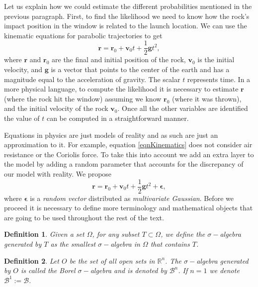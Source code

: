 \documentclass[12pt]{book}
\newtheorem{definition}{Definition}
\begin{document}
Let us explain how we could estimate the different probabilities mentioned in the previous paragraph. 
First, to find the likelihood
we need to know how the rock's impact position  in the window  is related to the launch location. 
We can use
the kinematic equations  for parabolic trajectories to get \cite{arnol2013mathematical}
\begin{equation}\label{eqnKinematics}
\textbf{r}=\textbf{r}_{0}+\textbf{v}_{0}t+\frac{1}{2}\textbf{g}t^{2},
\end{equation} 
where $\textbf{r}$ and $\textbf{r}_{0}$ are the final and initial position of the rock, 
$\textbf{v}_{0}$ is 
the initial velocity,  and $\textbf{g}$ is  a vector that points to the center of the earth and has a 
magnitude equal to the acceleration of gravity. The scalar $t$ represents time.
In a more physical language, to compute the likelihood it is necessary to estimate $\textbf{r}$ (where the 
rock hit the window) assuming we know $\textbf{r}_{0}$ (where it was thrown), and the initial velocity 
of the rock $\textbf{v}_{0}$. 
Once all the other variables are identified the value of $t$ can be computed in a straightforward manner. 

Equations in physics are just models of reality and as such are just an approximation to it. 
For example, equation \eqref{eqnKinematics} does not consider air resistance or the
Coriolis force. To take
this into account we add an extra layer to the model by adding a random parameter that accounts
for the discrepancy of our model with reality. We propose 
\begin{equation}\label{eqnParabolicEpsilon}
\textbf{r}=\textbf{r}_{0}+\textbf{v}_{0}t+\frac{1}{2}\textbf{g}t^{2}+\mathbf{\epsilon},
\end{equation} 
where $\mathbf{\epsilon}$ is a \textit{random vector} distributed as \textit{multivariate Gaussian}. 
Before we proceed it is necessary to define more terminology and mathematical objects  that are going 
to be used throughout the rest of the text. 

\begin{definition}
Given a set $\Omega$, for any subset $T\subset\Omega$, we define the $\sigma-$algebra generated by $T$ as
the smallest $\sigma-$algebra in $\Omega$ that contains $T$.
\end{definition}

\begin{definition}
Let $O$ be the set of all open sets in $\mathbb{R}^{n}$. The $\sigma-$algebra generated by $O$ is called
the Borel $\sigma-$algebra and is denoted by $\mathcal{B}^{n}$. If $n=1$ we denote 
$\mathcal{B}^{1}:=\mathcal{B}$.
\end{definition}
\end{document}
